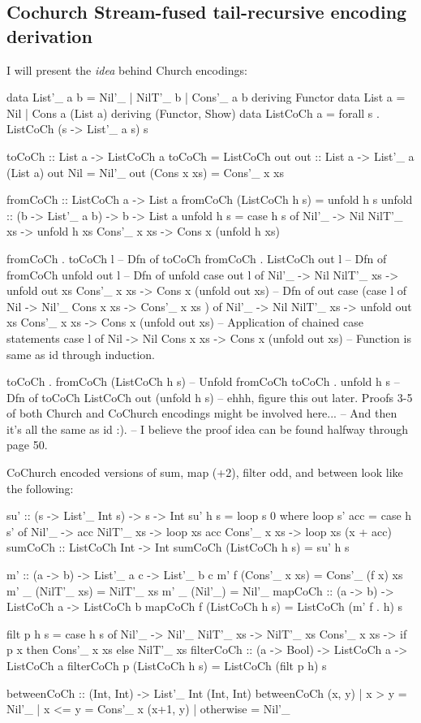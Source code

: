 
\subsection{Cochurch Stream-fused tail-recursive encoding derivation}
I will present the \textit{idea} behind Church encodings:
\begin{spec}
data List'_ a b = Nil'_ | NilT'_ b | Cons'_ a b deriving Functor
data List a = Nil | Cons a (List a) deriving (Functor, Show)
data ListCoCh a = forall s . ListCoCh (s -> List'_ a s) s

toCoCh :: List a -> ListCoCh a
toCoCh = ListCoCh out
out :: List a -> List'_ a (List a)
out Nil = Nil'_
out (Cons x xs) = Cons'_ x xs

fromCoCh :: ListCoCh a -> List a
fromCoCh (ListCoCh h s) = unfold h s
unfold :: (b -> List'_ a b) -> b -> List a
unfold h s = case h s of
  Nil'_ -> Nil
  NilT'_ xs -> unfold h xs
  Cons'_ x xs -> Cons x (unfold h xs)


fromCoCh . toCoCh l
-- Dfn of toCoCh
fromCoCh . ListCoCh out l
-- Dfn of fromCoCh
unfold out l
-- Dfn of unfold
case out l of
  Nil'_ -> Nil
  NilT'_ xs -> unfold out xs
  Cons'_ x xs -> Cons x (unfold out xs)
-- Dfn of out
case (case l of
  Nil -> Nil'_
  Cons x xs -> Cons'_ x xs
  ) of
  Nil'_ -> Nil
  NilT'_ xs -> unfold out xs
  Cons'_ x xs -> Cons x (unfold out xs)
-- Application of chained case statements
case l of
  Nil -> Nil
  Cons x xs -> Cons x (unfold out xs)
-- Function is same as id through induction.


toCoCh . fromCoCh (ListCoCh h s)
-- Unfold fromCoCh
toCoCh . unfold h s
-- Dfn of toCoCh
ListCoCh out (unfold h s)
-- ehhh, figure this out later. Proofs 3-5 of both Church and CoChurch encodings might be involved here...
-- And then it's all the same as id :).
-- I believe the proof idea can be found halfway through page 50.
\end{spec}
CoChurch encoded versions of sum, map (+2), filter odd, and between look like the following:
\begin{spec}
su' :: (s -> List'_ Int s) -> s -> Int
su' h s = loop s 0
  where loop s' acc = case h s' of
    Nil'_ -> acc
    NilT'_ xs -> loop xs acc
    Cons'_ x xs -> loop xs (x + acc)
sumCoCh :: ListCoCh Int -> Int
sumCoCh (ListCoCh h s) = su' h s

m' :: (a -> b) -> List'_ a c -> List'_ b c
m' f (Cons'_ x xs) = Cons'_ (f x) xs
m' _ (NilT'_ xs) = NilT'_ xs
m' _ (Nil'_) = Nil'_
mapCoCh :: (a -> b) -> ListCoCh a -> ListCoCh b
mapCoCh f (ListCoCh h s) = ListCoCh (m' f . h) s

filt p h s = case h s of
               Nil'_ -> Nil'_
               NilT'_ xs -> NilT'_ xs
               Cons'_ x xs -> if p x then Cons'_ x xs else NilT'_ xs
filterCoCh :: (a -> Bool) -> ListCoCh a -> ListCoCh a
filterCoCh p (ListCoCh h s) = ListCoCh (filt p h) s

betweenCoCh :: (Int, Int) -> List'_ Int (Int, Int)
betweenCoCh (x, y)
  | x > y = Nil'_
  | x <= y = Cons'_ x (x+1, y)
  | otherwise = Nil'_
\end{spec}
